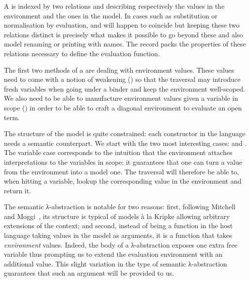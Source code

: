 A  is indexed by two relations  and 
describing respectively the values in the environment and the ones
in the model. In cases such as substitution or normalisation by
evaluation,  and  will happen to coincide but keeping
these two relations distinct is precisely what makes it possible
to go beyond these and also model renaming or printing with names.
The record packs the properties of these relations necessary to
define the evaluation function.


The first two methods of a  are dealing with environment
values. These values need to come with a notion of weakening ()
so that the traversal may introduce fresh variables when going under a
binder and keep the environment well-scoped. We also need to be able to
manufacture environment values given a variable in scope ()
in order to be able to craft a diagonal environment to evaluate an open
term.


The structure of the model is quite constrained: each constructor
in the language needs a semantic counterpart. We start with the
two most interesting cases:  and . The variable
case corresponds to the intuition that the environment attaches
interpretations to the variables in scope: it guarantees that one
can turn a value from the environment into a model one. The traversal
will therefore be able to, when hitting a variable, lookup the
corresponding value in the environment and return it.


The semantic λ-abstraction is notable for two reasons: first, following
Mitchell and Moggi~\cite{mitchell1991kripke}, its structure is typical
of models à la Kripke allowing arbitrary extensions of the context; and
second, instead of being a function in the host language taking values
in the model as arguments, it is a function that takes \emph{environment}
values. Indeed, the body of a λ-abstraction exposes one extra free variable
thus prompting us to extend the evaluation environment with an additional
value. This slight variation in the type of semantic λ-abstraction
guarantees that such an argument will be provided to us.


